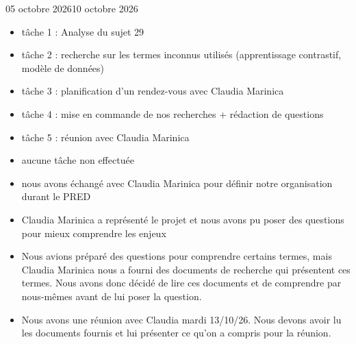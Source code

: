 \documentclass[12pt]{fiche-rd-info}
\begin{document}

\begin{fichesuivi}{05 octobre 2026}{10 octobre 2026}

	\begin{travaileffectue}
		\begin{itemize}
			\item tâche 1 : Analyse du sujet 29
			\item tâche 2 : recherche sur les termes inconnus utilisés (apprentissage contrastif, modèle de données)
			\item tâche 3 : planification d'un rendez-vous avec Claudia Marinica
			\item tâche 4 : mise en commande de nos recherches + rédaction de questions
			\item tâche 5 : réunion avec Claudia Marinica
		\end{itemize}
	\end{travaileffectue}

	\begin{travailnoneffectue}
		\begin{itemize}
			\item aucune tâche non effectuée
		\end{itemize}
	\end{travailnoneffectue}

	\begin{echange}
		\begin{itemize}
			\item nous avons échangé avec Claudia Marinica pour définir notre organisation durant le PRED
			\item Claudia Marinica a représenté le projet et nous avons pu poser des questions pour mieux comprendre les enjeux
			\item Nous avions préparé des questions pour comprendre certains termes, mais Claudia Marinica nous a fourni des documents de recherche qui présentent ces termes. Nous avons donc décidé de lire ces documents et de comprendre par nous-mêmes avant de lui poser la question.
		\end{itemize}
	\end{echange}

	\begin{planification}
		\begin{itemize}
			\item Nous avons une réunion avec Claudia mardi 13/10/26. Nous devons avoir lu les documents fournis et lui présenter ce qu'on a compris pour la réunion.
		\end{itemize}
	\end{planification}
\end{fichesuivi}
\end{document}
